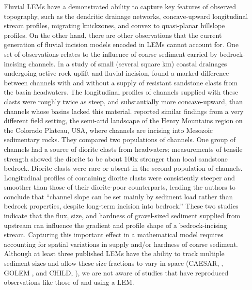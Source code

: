\documentclass[journal abbreviation, manuscript]{copernicus}
\begin{document}
Fluvial LEMs have a demonstrated ability to capture key features of observed topography, such as the  dendritic drainage networks, concave-upward longitudinal stream profiles, migrating knickzones, and convex to quasi-planar hillslope profiles. On the other hand, there are other observations that the current generation of fluvial incision models encoded in LEMs cannot account for. One set of observations relates to the influence of coarse sediment carried by bedrock-incising channels. In a study of small (several square km) coastal drainages undergoing active rock uplift and fluvial incision, \citet{duvall2004tectonic} found a marked difference between channels with and without a supply of resistant sandstone clasts from the basin headwaters. The longitudinal profiles of channels supplied with these clasts were roughly twice as steep, and substantially more concave-upward, than channels whose basins lacked this material. \citet{johnson2009transport} reported similar findings from a very different field setting, the semi-arid landscape of the Henry Mountains region on the Colorado Plateau, USA, where channels are incising into Mesozoic sedimentary rocks. They compared two populations of channels. One group of channels had a source of diorite clasts from headwaters; measurements of tensile strength showed the diorite to be about 100x stronger than local sandstone bedrock. Diorite clasts were rare or absent in the second population of channels. Longitudinal profiles of  containing diorite clasts were consistently steeper and smoother than those of their diorite-poor counterparts, leading the authors to conclude that ``channel slope can be set mainly by sediment load rather than bedrock properties, despite long-term incision into bedrock.'' These two studies indicate that the flux, size, and hardness of gravel-sized sediment supplied from upstream can influence the gradient and profile shape of a bedrock-incising stream. Capturing this important effect in a mathematical model requires accounting for spatial variations in supply and/or hardness of coarse sediment. Although at least three published LEMs have the ability to track multiple sediment sizes and allow these size fractions to vary in space (CAESAR, \citet{coulthard1996cellular}, GOLEM \citet{gasparini1999downstream,gasparini2004network,gasparini2008numerical}, and CHILD, \citet{tucker2001channel}), we are not aware of studies that have reproduced observations like those of \citet{duvall2004tectonic} and \citet{johnson2009transport} using a LEM.
\end{document}
